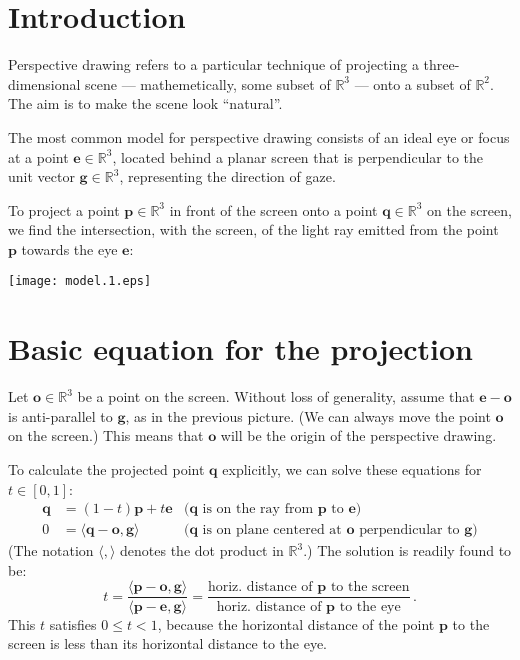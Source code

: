 \documentclass[12pt]{article}
\newcommand{\real}{\mathbb{R}}
\providecommand{\pe}{\mathbf{e}}
\providecommand{\vg}{\mathbf{g}}
\providecommand{\po}{\mathbf{o}}
\providecommand{\pp}{\mathbf{p}}
\providecommand{\pq}{\mathbf{q}}
\begin{document}
\tableofcontents

\section{Introduction}

Perspective drawing refers to a particular technique 
of projecting a three-dimensional scene ---
mathemetically, some subset of $\real^3$ --- onto a subset of $\real^2$.
The aim is to make the scene look ``natural''.

The most common model for perspective drawing consists of an ideal eye 
or focus at a point $\pe \in \real^3$,
located behind a planar screen that is perpendicular 
to the unit vector $\vg \in \real^3$,
representing the direction of gaze.


To project a point $\pp \in \real^3$ in front of the screen
onto a point $\pq \in \real^3$ on 
the screen, we find the intersection, with the screen,
of the light ray emitted from the point $\pp$ towards the eye $\pe$:

\begin{center}
\texttt{[image: model.1.eps]}
\end{center}

\section{Basic equation for the projection}
Let $\po \in \real^3$ be a point on the screen.
Without loss of generality, assume that $\pe - \po$ is anti-parallel to
$\vg$, as in the previous picture.  
(We can always move the point $\po$ on the screen.)
This means that $\po$ will be the origin of the perspective drawing.

To calculate the projected point $\pq$ explicitly, 
we can solve these equations for $t \in [0,1]$:
\begin{align*}
\pq &= (1-t) \pp + t\pe & \text{($\pq$ is on the ray from $\pp$ to $\pe$)} \\
0 &= \langle \pq - \po , \vg \rangle & 
\text{($\pq$ is on plane centered at $\po$ perpendicular to $\vg$)}
\end{align*}
(The notation $\langle, \rangle$ denotes the dot product in $\real^3$.)
The solution is readily found to be:
\[
t = \frac{\langle \pp - \po, \vg \rangle}{\langle \pp - \pe, \vg \rangle}
= \frac{\text{horiz. distance of $\pp$ to the screen}}{\text{horiz. distance of $\pp$ to the eye}}\,.
\]
This $t$ satisfies $0 \leq t < 1$, because the 
horizontal distance of the point $\pp$ to the screen is 
less than its horizontal distance to the eye.
\end{document}
